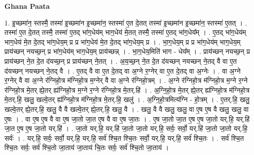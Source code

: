 \documentclass[17pt]{extarticle}
\begin{document}
\textbf{Ghana Paata } \newline

1. इ॒च्छमा॑न॒ स्तस्मै॒ तस्मा॑ इ॒च्छमा॑न इ॒च्छमा॑न॒ स्तस्मा॑ ए॒त दे॒तत् तस्मा॑ इ॒च्छमा॑न इ॒च्छमा॑न॒ स्तस्मा॑ ए॒तत् । . तस्मा॑ ए॒त दे॒तत् तस्मै॒ तस्मा॑ ए॒तद् भा॑ग॒धेय॑म् भाग॒धेय॑ मे॒तत् तस्मै॒ तस्मा॑ ए॒तद् भा॑ग॒धेय᳚म् । . ए॒तद् भा॑ग॒धेय॑म् भाग॒धेय॑ मे॒त दे॒तद् भा॑ग॒धेय॒म् प्र प्र भा॑ग॒धेय॑ मे॒त दे॒तद् भा॑ग॒धेय॒म् प्र । . भा॒ग॒धेय॒म् प्र प्र भा॑ग॒धेय॑म् भाग॒धेय॒म् प्राय॑च्छन् नयच्छ॒न् प्र भा॑ग॒धेय॑म् भाग॒धेय॒म् प्राय॑च्छन्न् । . भा॒ग॒धेय॒मिति॑ भाग - धेय᳚म् । . प्राय॑च्छन् नयच्छ॒न् प्र प्राय॑च्छन् ने॒त दे॒त द॑यच्छ॒न् प्र प्राय॑च्छन् ने॒तत् । . अ॒य॒च्छ॒न् ने॒त दे॒त द॑यच्छन् नयच्छन् ने॒तद् वै वा ए॒त द॑यच्छन् नयच्छन् ने॒तद् वै । . ए॒तद् वै वा ए॒त दे॒तद् वा अ॒ग्ने र॒ग्नेर् वा ए॒त दे॒तद् वा अ॒ग्नेः । . वा अ॒ग्ने र॒ग्नेर् वै वा अ॒ग्ने र॑ग्निहो॒त्र म॑ग्निहो॒त्र म॒ग्नेर् वै वा अ॒ग्ने र॑ग्निहो॒त्रम् । . अ॒ग्ने र॑ग्निहो॒त्र म॑ग्निहो॒त्र म॒ग्ने र॒ग्ने र॑ग्निहो॒त्र मे॒तर् ह्ये॒तर् ह्य॑ग्निहो॒त्र म॒ग्ने र॒ग्ने र॑ग्निहो॒त्र मे॒तर्.हि॑ । . अ॒ग्नि॒हो॒त्र मे॒तर् ह्ये॒तर् ह्य॑ग्निहो॒त्र म॑ग्निहो॒त्र मे॒तर्.हि॒ खलु॒ खल्वे॒तर् ह्य॑ग्निहो॒त्र म॑ग्निहो॒त्र मे॒तर्.हि॒ खलु॑ । . अ॒ग्नि॒हो॒त्रमित्य॑ग्नि - हो॒त्रम् । . ए॒तर्.हि॒ खलु॒ खल्वे॒तर् ह्ये॒तर्.हि॒ खलु॒ वै वै खल्वे॒तर् ह्ये॒तर्.हि॒ खलु॒ वै । . खलु॒ वै वै खलु॒ खलु॒ वा ए॒ष ए॒ष वै खलु॒ खलु॒ वा ए॒षः । . वा ए॒ष ए॒ष वै वा ए॒ष जा॒तो जा॒त ए॒ष वै वा ए॒ष जा॒तः । . ए॒ष जा॒तो जा॒त ए॒ष ए॒ष जा॒तो यर्.हि॒ यर्.हि॑ जा॒त ए॒ष ए॒ष जा॒तो यर्.हि॑ । . जा॒तो यर्.हि॒ यर्.हि॑ जा॒तो जा॒तो यर्.हि॒ सर्वः॒ सर्वो॒ यर्.हि॑ जा॒तो जा॒तो यर्.हि॒ सर्वः॑ । . यर्.हि॒ सर्वः॒ सर्वो॒ यर्.हि॒ यर्.हि॒ सर्व॑ श्चि॒त श्चि॒तः सर्वो॒ यर्.हि॒ यर्.हि॒ सर्व॑ श्चि॒तः । . सर्व॑ श्चि॒त श्चि॒तः सर्वः॒ सर्व॑ श्चि॒तो जा॒ताय॑ जा॒ताय॑ चि॒तः सर्वः॒ सर्व॑ श्चि॒तो जा॒ताय॑ । \newline
\end{document}
